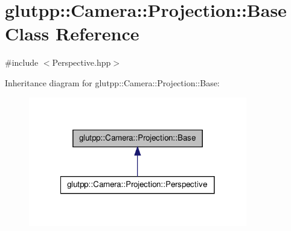 \hypertarget{classglutpp_1_1Camera_1_1Projection_1_1Base}{\section{glutpp\-:\-:\-Camera\-:\-:\-Projection\-:\-:\-Base \-Class \-Reference}
\label{classglutpp_1_1Camera_1_1Projection_1_1Base}
}


 




{\ttfamily \#include $<$\-Perspective.\-hpp$>$}



\-Inheritance diagram for glutpp\-:\-:\-Camera\-:\-:\-Projection\-:\-:\-Base\-:\nopagebreak
\begin{figure}[H]
\begin{center}
\leavevmode
\includegraphics[width=270pt]{classglutpp_1_1Camera_1_1Projection_1_1Base__inherit__graph}
\end{center}
\end{figure}
